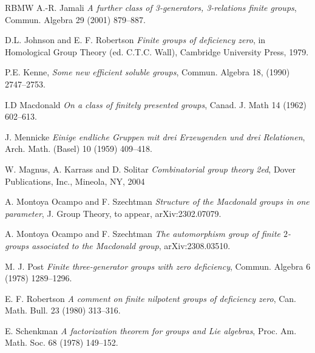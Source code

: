 \documentclass{amsart}
\theoremstyle{definition}
\theoremstyle{remark}
\begin{document}
{\begin{thebibliography}{RBMW}
 A.-R. Jamali \emph{A further class of 3-generators, 3-relations finite groups},
Commun. Algebra 29 (2001) 879--887.



 D.L. Johnson and E. F. Robertson \emph{Finite groups of deficiency zero},
in Homological Group Theory (ed. C.T.C. Wall), Cambridge University Press, 1979.

 P.E. Kenne, \emph{Some new efficient soluble groups},
Commun. Algebra 18, (1990) 2747--2753.


 I.D Macdonald \emph{On a class of finitely presented groups},
Canad. J. Math 14 (1962) 602--613.

 J. Mennicke \emph{Einige endliche Gruppen mit drei Erzeugenden und drei Relationen}, 
Arch. Math. (Basel) 10 (1959) 409--418.

 W. Magnus, A. Karrass and D. Solitar \emph{Combinatorial group theory 2ed}, 	Dover Publications, Inc., Mineola, NY, 2004


		

 A. Montoya Ocampo and F. Szechtman \emph{Structure of the Macdonald groups in one parameter}, J. Group Theory,
to appear, arXiv:2302.07079.





 A. Montoya Ocampo and F. Szechtman \emph{The automorphism group of finite $2$-groups associated to the Macdonald group}, 
arXiv:2308.03510.


 M. J. Post \emph{Finite three-generator groups with zero deficiency}, 
Commun. Algebra 6 (1978) 1289--1296.



 E. F. Robertson \emph{A comment on finite nilpotent groups of deficiency zero},
Can. Math. Bull. 23 (1980) 313--316.


 E. Schenkman \emph{A factorization theorem for groups and Lie algebras},
Proc. Am. Math. Soc. 68 (1978) 149--152.


\end{thebibliography}}
\end{document}
